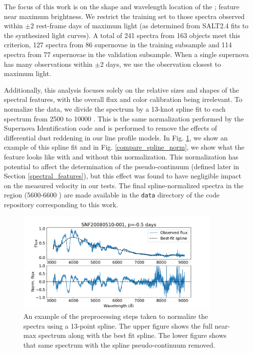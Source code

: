 The focus of this work is on the shape and wavelength location of the \siliconii; feature near maximum brightness. We restrict the training set to those spectra observed within $\pm 2$ rest-frame days of maximum light (as determined from SALT2.4 fits to the synthesized light curves). A total of 241 spectra from 163 objects meet this criterion, 127 spectra from 86 supernovae in the training subsample and 114 spectra from 77 supernovae in the validation subsample. When a single supernova has many observations within $\pm 2$ days, we use the observation closest to maximum light.

Additionally, this analysis focuses solely on the relative sizes and shapes of the spectral features, with the overall flux and color calibration being irrelevant. To normalize the data, we divide the spectrum by a 13-knot spline fit to each spectrum from 2500 \angstrom\; to 10000 \angstrom. This is the same normalization performed by the Supernova Identification code \citep[SNID,][]{blondin_determining_2007} and is performed to remove the effects of differential dust reddening in our line profile models. In Fig. \ref{spline_norm_ex}, we show an example of this spline fit and in Fig. \ref{compare_spline_norm}, we show what the \siliconii\; feature looks like with and without this normalization. This normalization has potential to affect the determination of the pseudo-continuum (defined later in Section \ref{spectral_features}), but this effect was found to have negligible impact on the measured velocity in our tests. The final spline-normalized spectra in the \siliconii\; region (5600-6600 \angstrom) are made available in the \verb|data| directory of the code repository corresponding to this work.

\begin{figure}[htbp]
    \centering
    \includegraphics[width=0.9\textwidth]{figures/si_feat_pca/spline_norm_ex.pdf}
    \caption{An example of the preprocessing steps taken to normalize the spectra using a 13-point spline. The upper figure shows the full near-max spectrum along with the best fit spline. The lower figure shows that same spectrum with the spline pseudo-continuum removed.}
    \label{spline_norm_ex}
\end{figure}

